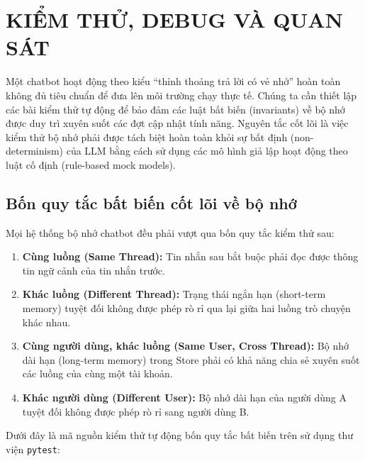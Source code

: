 \chapter{KIỂM THỬ, DEBUG VÀ QUAN SÁT}
\label{chap:testing}

Một chatbot hoạt động theo kiểu ``thỉnh thoảng trả lời có vẻ nhớ'' hoàn toàn không đủ tiêu chuẩn để đưa lên môi trường chạy thực tế. Chúng ta cần thiết lập các bài kiểm thử tự động để bảo đảm các luật bất biến (invariants) về bộ nhớ được duy trì xuyên suốt các đợt cập nhật tính năng. Nguyên tắc cốt lõi là việc kiểm thử bộ nhớ phải được tách biệt hoàn toàn khỏi sự bất định (non-determinism) của LLM bằng cách sử dụng các mô hình giả lập hoạt động theo luật cố định (rule-based mock models).

\section{Bốn quy tắc bất biến cốt lõi về bộ nhớ}

Mọi hệ thống bộ nhớ chatbot đều phải vượt qua bốn quy tắc kiểm thử sau:
\begin{enumerate}
  \item \textbf{Cùng luồng (Same Thread):} Tin nhắn sau bắt buộc phải đọc được thông tin ngữ cảnh của tin nhắn trước.
  \item \textbf{Khác luồng (Different Thread):} Trạng thái ngắn hạn (short-term memory) tuyệt đối không được phép rò rỉ qua lại giữa hai luồng trò chuyện khác nhau.
  \item \textbf{Cùng người dùng, khác luồng (Same User, Cross Thread):} Bộ nhớ dài hạn (long-term memory) trong Store phải có khả năng chia sẻ xuyên suốt các luồng của cùng một tài khoản.
  \item \textbf{Khác người dùng (Different User):} Bộ nhớ dài hạn của người dùng A tuyệt đối không được phép rò rỉ sang người dùng B.
\end{enumerate}

Dưới đây là mã nguồn kiểm thử tự động bốn quy tắc bất biến trên sử dụng thư viện \texttt{pytest}:

\begingroup

\endgroup


